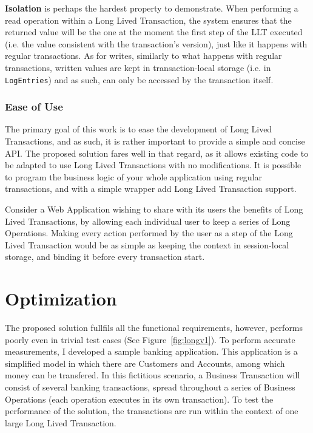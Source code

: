 \documentclass{llncs}
\begin{document}
{\bf Isolation} is perhaps the hardest property to demonstrate. When
performing a read operation within a Long Lived Transaction, the
system ensures that the returned value will be the one at the moment
the first step of the LLT executed (i.e. the value consistent with the
transaction's version), just like it happens with regular
transactions.  As for writes, similarly to what happens with regular
transactions, written values are kept in transaction-local storage
(i.e. in \texttt{LogEntries}) and as such, can only be accessed by the
transaction itself.


\subsubsection{Ease of Use}

The primary goal of this work is to ease the development of Long Lived
Transactions, and as such, it is rather important to provide a simple
and concise API. The proposed solution fares well in that regard, as
it allows existing code to be adapted to use Long Lived Transactions
with no modifications. It is possible to program the business logic of
your whole application using regular transactions, and with a simple
wrapper add Long Lived Transaction support.

Consider a Web Application wishing to share with its users the
benefits of Long Lived Transactions, by allowing each individual user
to keep a series of Long Operations. Making every action performed by
the user as a step of the Long Lived Transaction would be as simple as
keeping the context in session-local storage, and binding it before
every transaction start.



\section{Optimization}

The proposed solution fullfils all the functional requirements,
however, performs poorly even in trivial test cases (See
Figure~\ref{fig:longv1}). To perform accurate measurements, I
developed a sample banking application. This application is a
simplified model in which there are Customers and Accounts, among
which money can be transfered. In this fictitious scenario, a Business
Transaction will consist of several banking transactions, spread
throughout a series of Business Operations (each operation executes in
its own transaction). To test the performance of the solution, the
transactions are run within the context of one large Long Lived
Transaction.
\end{document}
